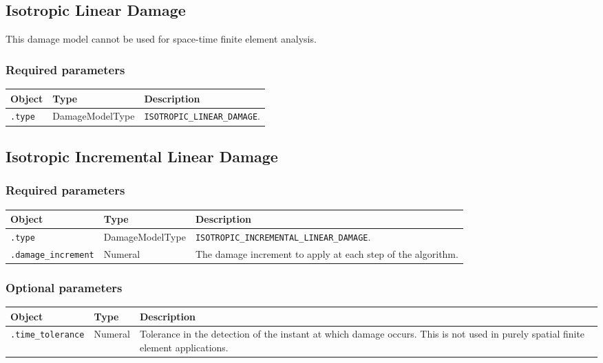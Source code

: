 \documentclass[10pt]{article}
\begin{document}
\subsection{Isotropic Linear Damage}

This damage model cannot be used for space-time finite element analysis.

\subsubsection*{Required parameters}

\begin{tabularx}{\textwidth}{llX}
\hline 
Object & Type & Description \\ 
\hline 
\verb+.type+ & DamageModelType & \verb+ISOTROPIC_LINEAR_DAMAGE+. \\ 
\hline 
\end{tabularx}

\subsection{Isotropic Incremental Linear Damage}

\subsubsection*{Required parameters}

\begin{tabularx}{\textwidth}{llX}
\hline 
Object & Type & Description \\ 
\hline 
\verb+.type+ & DamageModelType & \verb+ISOTROPIC_INCREMENTAL_LINEAR_DAMAGE+. \\ 
\verb+.damage_increment+ & Numeral & The damage increment to apply at each step of the algorithm. \\
\hline 
\end{tabularx}

\subsubsection*{Optional parameters}

\begin{tabularx}{\textwidth}{llX}
\hline 
Object & Type & Description \\ 
\hline 
\verb+.time_tolerance+ & Numeral & Tolerance in the detection of the instant at which damage occurs. This is not used in purely spatial finite element applications. \\
\hline 
\end{tabularx}
\end{document}

